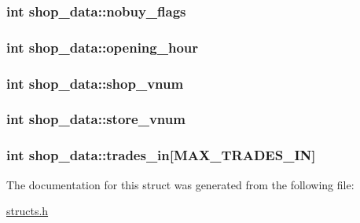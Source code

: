 \hypertarget{structshop__data_a22ce6d6e9828d8de7a0015f4486c869e}{
\subsubsection[{nobuy\-\_\-flags}]{\setlength{\rightskip}{0pt plus 5cm}int shop\-\_\-data\-::nobuy\-\_\-flags}}\label{structshop__data_a22ce6d6e9828d8de7a0015f4486c869e}
\hypertarget{structshop__data_ae38c49cdd3f821de967f0a01faf4931b}{
\subsubsection[{opening\-\_\-hour}]{\setlength{\rightskip}{0pt plus 5cm}int shop\-\_\-data\-::opening\-\_\-hour}}\label{structshop__data_ae38c49cdd3f821de967f0a01faf4931b}
\hypertarget{structshop__data_aff411fdd205015f941000f5fb060a297}{
\subsubsection[{shop\-\_\-vnum}]{\setlength{\rightskip}{0pt plus 5cm}int shop\-\_\-data\-::shop\-\_\-vnum}}\label{structshop__data_aff411fdd205015f941000f5fb060a297}
\hypertarget{structshop__data_a5e341c298ea7232f1f53a447ce393c7b}{
\subsubsection[{store\-\_\-vnum}]{\setlength{\rightskip}{0pt plus 5cm}int shop\-\_\-data\-::store\-\_\-vnum}}\label{structshop__data_a5e341c298ea7232f1f53a447ce393c7b}
\hypertarget{structshop__data_aa571b13eddacde07b3e0ec0bb329efbf}{
\subsubsection[{trades\-\_\-in}]{\setlength{\rightskip}{0pt plus 5cm}int shop\-\_\-data\-::trades\-\_\-in\mbox{[}{\bf M\-A\-X\-\_\-\-T\-R\-A\-D\-E\-S\-\_\-\-I\-N}\mbox{]}}}\label{structshop__data_aa571b13eddacde07b3e0ec0bb329efbf}


The documentation for this struct was generated from the following file\-:\begin{DoxyCompactItemize}
\item 
\hyperlink{structs_8h}{structs.\-h}\end{DoxyCompactItemize}
